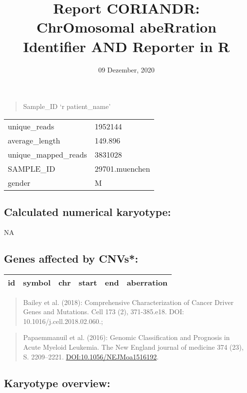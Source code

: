 \documentclass[]{article}
\title{Report CORIANDR: ChrOmosomal abeRration Identifier AND Reporter in R}
\author{}
\date{09 Dezember, 2020}
\begin{document}
\maketitle

\begin{quote}
Sample\_ID `r patient\_name'
\end{quote}

\begin{longtable}[]{@{}ll@{}}
\toprule
\endhead
unique\_reads & 1952144\tabularnewline
average\_length & 149.896\tabularnewline
unique\_mapped\_reads & 3831028\tabularnewline
SAMPLE\_ID & 29701.muenchen\tabularnewline
gender & M\tabularnewline
\bottomrule
\end{longtable}

\hypertarget{calculated-numerical-karyotype}{%
\subsection{Calculated numerical
karyotype:}\label{calculated-numerical-karyotype}}

NA

\hypertarget{genes-affected-by-cnvs}{%
\subsection{Genes affected by CNVs*:}\label{genes-affected-by-cnvs}}

\begin{longtable}[]{@{}llllll@{}}
\toprule
id & symbol & chr & start & end & aberration\tabularnewline
\midrule
\endhead
\bottomrule
\end{longtable}

\begin{quote}
Bailey et al. (2018): Comprehensive Characterization of Cancer Driver
Genes and Mutations. Cell 173 (2), 371-385.e18. DOI:
10.1016/j.cell.2018.02.060.;
\end{quote}

\begin{quote}
Papaemmanuil et al. (2016): Genomic Classification and Prognosis in
Acute Myeloid Leukemia. The New England journal of medicine 374 (23), S.
2209--2221. \url{DOI:10.1056/NEJMoa1516192}.
\end{quote}

\hypertarget{karyotype-overview}{%
\subsection{Karyotype overview:}\label{karyotype-overview}}
\end{document}
